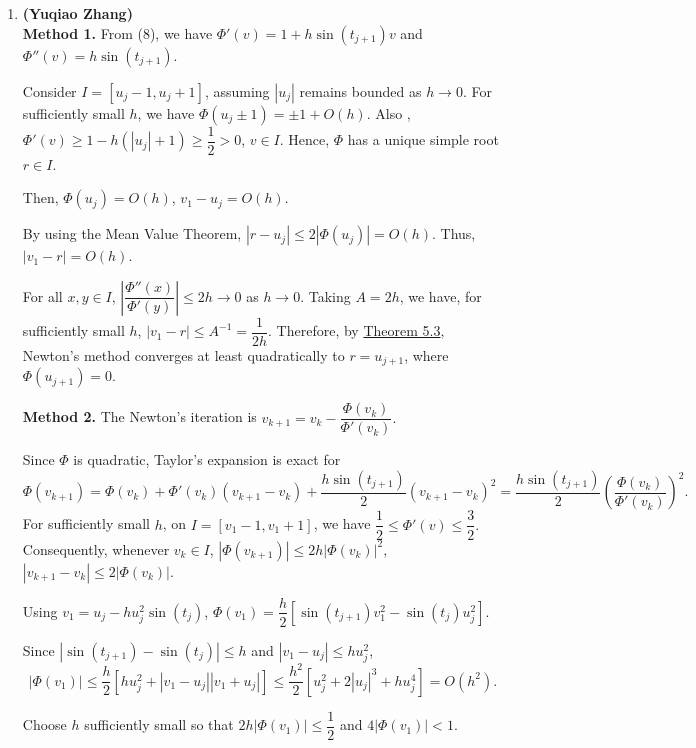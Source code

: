 \documentclass[11pt]{article}
\begin{document}
\begin{enumerate}
        Then, we have $R(0)=-u_j+\dfrac h2u_j^2\sin(t_j)=\Phi(0)$.  Since $R'=\Phi'$ and $R(0)=\Phi(0)$, we obtain that $R(v)=\Phi(v)$ for all $v$. Thereby, $R(u_{j+1})=0$ if and only if $\Phi(u_{j+1})=0$. 
    
    \item \textbf{(Yuqiao Zhang)} \\ 
        \textbf{Method 1.} From (8), we have $\Phi'(v)=1+h\sin(t_{j+1})v$ and $\Phi''(v)=h\sin(t_{j+1})$. 

        Consider $I=[u_j-1,u_j+1]$, assuming $|u_j|$ remains bounded as $h\to0$. For sufficiently small $h$, we have $\Phi(u_j\pm1)=\pm 1+O(h)$. Also , $\Phi'(v)\ge1-h(|u_j|+1)\ge\dfrac12>0$, $v \in I$.  Hence, $\Phi$ has a unique simple root $r\in I$.

        Then, $\Phi(u_j)=O(h)$, $v_1-u_j=O(h)$. 
        
        By using the Mean Value Theorem, $|r-u_j|\le2|\Phi(u_j)|=O(h).$ Thus, $|v_1-r|=O(h)$. 

        For all $x, y \in I$, $\left|\dfrac{\Phi''(x)}{\Phi'(y)}\right| \le2h\longrightarrow0$ as $h\to0.$ Taking $A=2h$, we have, for sufficiently small $h$, $|v_1-r|\le A^{-1}=\dfrac1{2h}$. Therefore, by \href{https://jackrthomas.github.io/Math5485/lectures/L05.html#newton}{Theorem 5.3}, Newton's method converges at least quadratically to $r=u_{j+1}$, where $\Phi(u_{j+1})=0$.

        \textbf{Method 2.} The Newton's iteration is $v_{k+1}=v_k-\dfrac{\Phi(v_k)}{\Phi'(v_k)}.$

        Since $\Phi$ is quadratic, Taylor's expansion is exact for 
        $$
        \Phi(v_{k+1})
        =\Phi(v_k)+\Phi'(v_k)(v_{k+1}-v_k) +\dfrac{h\sin(t_{j+1})}{2}(v_{k+1}-v_k)^2
        =\dfrac{h\sin(t_{j+1})}{2} \left(\dfrac{\Phi(v_k)}{\Phi'(v_k)}\right)^2.
        $$
        For sufficiently small $h$, on
        $I=[v_1-1,v_1+1]$, we have $\dfrac{1}{2} \le \Phi'(v) \le \dfrac{3}{2}.$ Consequently, whenever $v_k\in I$, $|\Phi(v_{k+1})|\le2h|\Phi(v_k)|^2$, $|v_{k+1}-v_k|\le2|\Phi(v_k)|$. 
        
        Using $v_1=u_j-hu_j^2\sin(t_j)$, $\Phi(v_1)=\dfrac{h}{2} \left[\sin(t_{j+1})v_1^2-\sin(t_j)u_j^2\right].$
        
        Since $|\sin(t_{j+1})-\sin(t_j)|\le h$ and $|v_1-u_j|\le hu_j^2$, 
        $$|\Phi(v_1)| \le\dfrac h2\left[hu_j^2+|v_1-u_j||v_1+u_j|\right] \le\dfrac{h^2}{2}\left[u_j^2+2|u_j|^3+hu_j^4\right]=O(h^2).$$
        
        Choose $h$ sufficiently small so that $2h|\Phi(v_1)|\le\dfrac12$ and $4|\Phi(v_1)|<1.$
        

\end{enumerate}
\end{document}
